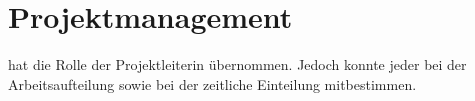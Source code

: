 \section{Projektmanagement}\label{sec:Projektmanagement}
\nameSH hat die Rolle der Projektleiterin übernommen. Jedoch konnte jeder bei der Arbeitsaufteilung sowie bei der zeitliche Einteilung mitbestimmen. 

\pagebreak

